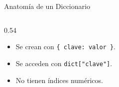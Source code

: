 \documentclass[aspectratio=169, 11pt]{beamer}
\begin{document}
\begin{frame}[fragile,shrink=25]{Anatomía de un Diccionario}
\begin{columns}[T]
\begin{column}{0.54\textwidth}
      \vspace{2pt}
      {\scriptsize\color{textMuted}
      \begin{itemize}\setlength{\itemsep}{2pt}
        \item[{\color{arcaRed}\scriptsize\faArrowRight}]
          Se crean con \texttt{\{\,clave: valor\,\}}.
        \item[{\color{arcaRed}\scriptsize\faArrowRight}]
          Se acceden con \texttt{dict["clave"]}.
        \item[{\color{arcaRed}\scriptsize\faArrowRight}]
          No tienen índices numéricos.
      \end{itemize}
      }
    \end{column}
  \end{columns}
\end{frame}
\end{document}
